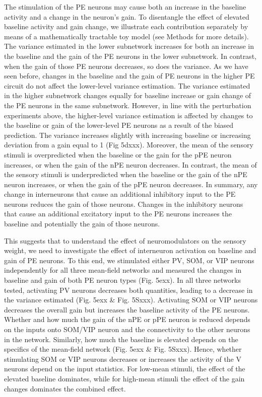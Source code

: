 \documentclass[10pt,a4paper,draft]{article}
\begin{document}
The stimulation of the PE neurons may cause both an increase in the baseline activity and a change in the neuron's gain. To disentangle the effect of elevated baseline activity and gain change, we illustrate each contribution separately by means of a mathematically tractable toy model (see Methods for more details). The variance estimated in the lower subnetwork increases for both an increase in the baseline and the gain of the PE neurons in the lower subnetwork. In contrast, when the gain of those PE neurons decreases, so does the variance. As we have seen before, changes in the baseline and the gain of PE neurons in the higher PE circuit do not affect the lower-level variance estimation. The variance estimated in the higher subnetwork changes equally for baseline increase or gain change of the PE neurons in the same subnetwork. However, in line with the perturbation experiments above, the higher-level variance estimation is affected by changes to the baseline or gain of the lower-level PE neurons as a result of the biased prediction. The variance increases slightly with increasing baseline or increasing deviation from a gain equal to 1 (Fig 5dxxx). Moreover, the mean of the sensory stimuli is overpredicted when the baseline or the gain for the pPE neuron increases, or when the gain of the nPE neuron decreases. In contrast, the mean of the sensory stimuli is underpredicted when the baseline or the gain of the nPE neuron increases, or when the gain of the pPE neuron decreases. In summary, any change in interneurons that cause an additional inhibitory input to the PE neurons reduces the gain of those neurons. Changes in the inhibitory neurons that cause an additional excitatory input to the PE neurons increases the baseline and potentially the gain of those neurons.

This suggests that to understand the effect of neuromodulators on the sensory weight, we need to investigate the effect of interneuron activation on baseline and gain of PE neurons. To this end, we stimulated either PV, SOM, or VIP neurons independently for all three mean-field networks and measured the changes in baseline and gain of both PE neuron types (Fig. 5exx). 
In all three networks tested, activating PV neurons decreases both quantities, leading to a decrease in the variance estimated (Fig. 5exx \& Fig. 5Sxxx). Activating SOM or VIP neurons decreases the overall gain but increases the baseline activity of the PE neurons. Whether and how much the gain of the nPE or pPE neuron is reduced depends on the inputs onto SOM/VIP neuron and the connectivity to the other neurons in the network. Similarly, how much the baseline is elevated depends on the specifics of the mean-field network (Fig. 5exx \& Fig. 5Sxxx). Hence, whether stimulating SOM or VIP neurons decreases or increases the activity of the V neurons depend on the input statistics. For low-mean stimuli, the effect of the elevated baseline dominates, while for high-mean stimuli the effect of the gain changes dominates the combined effect. 
\end{document}
